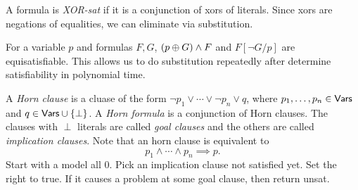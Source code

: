 A formula is \textit{XOR-sat} if it is a conjunction of xors of literals. Since xors are negations of equalities, we can eliminate via substitution.

For a variable $p$ and formulas $F,G$, $(p\oplus G)\wedge F$ and $F[\neg G/p]$ are equisatisfiable. This allows us to do substitution repeatedly after determine satisfiability in polynomial time.

A \textit{Horn clause} is a cluase of the form $\neg p_1\lor \cdots\lor\neg p_n \lor q$, where $p_1,\ldots,p_n\in\mathsf{Vars}$ and $q\in\mathsf{Vars}\cup\{\perp\}$. A \textit{Horn formula} is a conjunction of Horn clauses. The clauses with $\perp$ literals are called \textit{goal clauses} and the others are called \textit{implication clauses}. Note that an horn clause is equivalent to
\[ p_1 \land \cdots \land p_n \implies p. \]
Start with a model all $0$. Pick an implication clause not satisfied yet. Set the right to true. If it causes a problem at some goal clause, then return unsat.